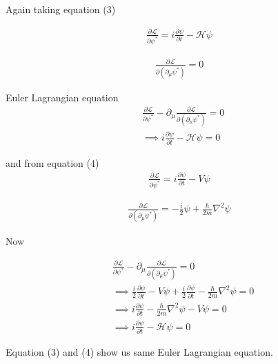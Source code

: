 \documentclass[12pt, letterpaper]{article}
\newcommand*{\1}{\hspace{1pt}}
\begin{document}
    Again taking equation (3)

    \begin{align*}
        \frac{\partial \mathcal{L}}{\partial \psi^{\ast}} = i\frac{\partial \psi}{\partial t} -\mathcal{H}\psi
    \end{align*}

    \begin{align*}
        \frac{\partial \mathcal{L}}{\partial (\partial_{\mu}\psi^{\ast})} = 0
    \end{align*}

    Euler Lagrangian equation 
    \begin{align*}
        & \frac{\partial \mathcal{L}}{\partial \psi^{\ast}}  - \partial _{\mu}\frac{\partial \mathcal{L}}{\partial (\partial_{\mu}\psi^{\ast})} = 0 \\
        & \implies i\frac{\partial \psi}{\partial t} -\mathcal{H}\psi = 0
    \end{align*}

    and from equation (4)
    \begin{align*}
        \frac{\partial \mathcal{L}}{\partial \psi^{\ast}} = i\frac{\partial \psi}{\partial t} -V\psi
    \end{align*}

    \begin{align*}
        \frac{\partial \mathcal{L}}{\partial (\partial_{\mu}\psi^{\ast})} = -\frac{i}{2}\psi + \frac{\hbar}{2m}\nabla^{2} \psi
    \end{align*}

    Now 

    \begin{align*}
         & \frac{\partial \mathcal{L}}{\partial \psi^{\ast}}  - \partial _{\mu}\frac{\partial \mathcal{L}}{\partial (\partial_{\mu}\psi^{\ast})} = 0 \\
         & \implies  \frac{i}{2}\frac{\partial \psi}{\partial t} -V\psi +\frac{i}{2}\frac{\partial \psi}{\partial t} - \frac{\hbar}{2m}\nabla^{2} \psi = 0 \\ 
         & \implies i\frac{\partial \psi}{\partial t} - \frac{\hbar}{2m}\nabla^{2} \psi - V\psi = 0 \\ 
         & \implies i\frac{\partial \psi}{\partial t} -\mathcal{H}\psi = 0
    \end{align*}
    
    Equation (3) and (4) show us same Euler Lagrangian equation.
\end{document}
